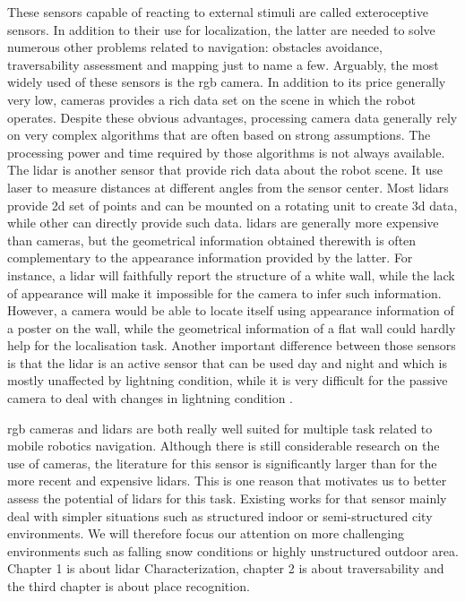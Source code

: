 These sensors capable of reacting to external stimuli are called exteroceptive sensors. In addition to their use for localization, the latter are needed to solve numerous other problems related to navigation: obstacles avoidance, traversability assessment and mapping just to name a few. Arguably, the most widely used of these sensors is the \gls{rgb} camera. In addition to its price generally very low, cameras provides a rich data set on the scene in which the robot operates. Despite these obvious advantages, processing camera data generally rely on very complex algorithms that are often based on strong assumptions. The processing power and time required by those algorithms is not always available. The \gls{lidar} is another sensor that provide rich data about the robot scene. It use laser to measure distances at different angles from the sensor center. Most \gls{lidar}s provide \gls{2d} set of points and can be mounted on a rotating unit to create \gls{3d} data, while other can directly provide such data. \gls{lidar}s are generally more expensive than cameras, but the geometrical information obtained therewith is often complementary to the appearance information provided by the latter. For instance, a \gls{lidar} will faithfully report the structure of a white wall, while the lack of appearance will make it impossible for the camera to infer such information. However, a camera would be able to locate itself using appearance information of a poster on the wall, while the geometrical information of a flat wall could hardly help for the localisation task. Another important difference between those sensors is that the \gls{lidar} is an active sensor that can be used day and night and which is mostly unaffected by lightning condition, while it is very difficult for the passive camera to deal with changes in lightning condition .

\gls{rgb} cameras and \gls{lidar}s are both really well suited for multiple task related to mobile robotics navigation. Although there is still considerable research on the use of cameras, the literature for this sensor is significantly larger than for the more recent and expensive \gls{lidar}s. This is one reason that motivates us to better assess the potential of \gls{lidar}s for this task. Existing works for that sensor mainly deal with simpler situations such as structured indoor or semi-structured city environments. We will therefore focus our attention on more challenging environments such as falling snow conditions or highly unstructured outdoor area.  Chapter 1 is about \gls{lidar} Characterization, chapter 2 is about traversability and the third chapter is about place recognition.
